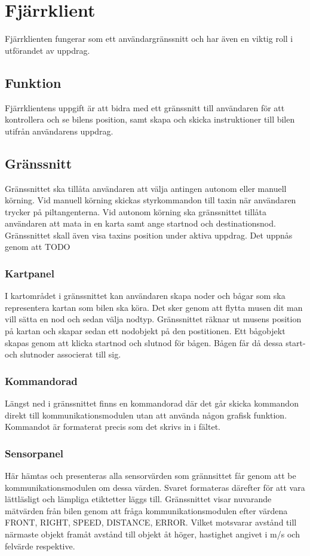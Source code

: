\documentclass[tekniskrapport/tech.tex]{subfiles}
\begin{document}
\section{Fjärrklient}
Fjärrklienten fungerar som ett användargränssnitt och har även en
viktig roll i utförandet av uppdrag.

\subsection{Funktion}
Fjärrklientens uppgift är att bidra med ett gränssnitt till användaren för att
kontrollera och se bilens position, samt skapa och skicka instruktioner till bilen
utifrån användarens uppdrag.

\subsection{Gränssnitt} Gränssnittet ska tillåta användaren att välja antingen
autonom eller manuell körning. Vid manuell körning skickas styrkommandon till
taxin när användaren trycker på piltangenterna. Vid autonom körning ska
gränssnittet tillåta användaren att mata in en karta samt ange startnod och
destinationsnod. Gränssnittet skall även visa taxins position under aktiva
uppdrag. Det uppnås genom att TODO

\subsubsection{Kartpanel}
I kartområdet i gränssnittet kan användaren skapa noder och bågar som ska
representera kartan som bilen ska köra. Det sker genom att flytta musen dit
man vill sätta en nod och sedan välja nodtyp. Gränssnittet räknar
ut musens position på kartan och skapar sedan ett nodobjekt på den postitionen.
Ett bågobjekt skapas genom att klicka startnod och slutnod för bågen.
Bågen får då dessa start- och slutnoder associerat till sig.

\subsubsection{Kommandorad}
Längst ned i gränssnittet finns en kommandorad där det går skicka kommandon
direkt till kommunikationsmodulen utan att använda någon grafisk funktion.
Kommandot är formaterat precis som det skrivs in i fältet.

\subsubsection{Sensorpanel}
Här hämtas och presenteras alla sensorvärden som grännsittet får genom att be
kommunikationsmodulen om dessa värden. Svaret formateras därefter för att vara
lättläsligt och lämpliga etiktetter läggs till. Gränssnittet visar nuvarande
mätvärden från bilen genom att fråga kommunikationsmodulen efter värdena FRONT,
RIGHT, SPEED, DISTANCE, ERROR. Vilket motsvarar avstånd till närmaste objekt
framåt avstånd till objekt åt höger, hastighet angivet i m/s och felvärde
respektive. 
\end{document}
